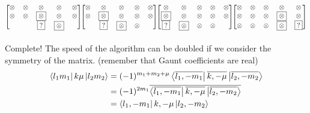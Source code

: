 \begin{equation*}
\begin{blockarray}{ccccc}
\begin{block}{[ccccc]}
  \otimes & \otimes & \otimes & \otimes & \otimes \\
  \otimes & \otimes & \boxed{\otimes} & \otimes & \otimes \\
  &  & \boxed{?} & \boxed{\otimes} &  \\
\end{block}
\end{blockarray}
\begin{blockarray}{ccccc}
\begin{block}{[ccccc]}
  \otimes & \otimes & \otimes & \otimes & \otimes \\
  \otimes & \boxed{\otimes} & \otimes & \otimes & \otimes \\
  & \boxed{?} & \boxed{\otimes} & \otimes &  \\
\end{block}
\end{blockarray}
\begin{blockarray}{ccccc}
\begin{block}{[ccccc]}
  \otimes & \otimes & \otimes & \otimes & \otimes \\
  \boxed{\otimes} & \otimes & \otimes & \otimes & \otimes \\
  \boxed{?} & \boxed{\otimes} & \otimes & \otimes &  \\
\end{block}
\end{blockarray}
\begin{blockarray}{ccccc}
\begin{block}{[ccccc]}
  \otimes & \otimes & \otimes & \otimes & \otimes \\
  \otimes & \otimes & \otimes & \boxed{\otimes} & \otimes \\
  \otimes & \otimes & \otimes & \boxed{\otimes} & \boxed{?} \\
\end{block}
\end{blockarray}
\end{equation*}
Complete! The speed of the algorithm can be doubled
if we consider the symmetry of the matrix. (remember that Gaunt coefficients
are real)
\begin{align} \label{eq:GauntSymm}
\Bra{l_1m_1}k\mu\Ket{l_2m_2}
& = (-1)^{m_1+m_2+\mu} \Bra{\overline{l_1,-m_1}}\overline{k,-\mu}\Ket{\overline{l_2,-m_2}} \nonumber \\
& = (-1)^{2m_1} \overline{\Bra{\overline{l_1,-m_1}}\overline{k,-\mu}\Ket{\overline{l_2,-m_2}}} \nonumber \\
& = \Bra{l_1,-m_1}k,-\mu\Ket{l_2,-m_2}
\end{align}
